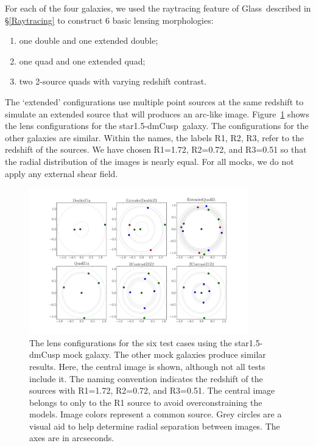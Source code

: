 \documentclass[galley,usenatbib]{mn2e}
\newcommand{\Glass}{{\sc Glass}}
\newcommand{\figref}[1] {Figure~\ref{#1}}
\newcommand{\secref}[1] {\S\ref{#1}}
\newcommand{\mockBC}{{\sc star1.5-dmCusp}}
\begin{document}
For each of the four galaxies, we used the raytracing feature of \Glass\
described in \secref{Raytracing} to construct 6 basic lensing morphologies:

\begin{enumerate}
\item one double and one extended double;
\item one quad and one extended quad;
\item two 2-source quads with varying redshift contrast.
\end{enumerate}
The `extended' configurations use multiple point sources at the same redshift
to simulate an extended source that will produces an arc-like image.
\figref{arrival surfaces} shows the lens configurations for the \mockBC\
galaxy.  The configurations for the other galaxies are similar. Within the
names, the labels R1, R2, R3, refer to the redshift of the sources. We have
chosen R1=1.72, R2=0.72, and R3=0.51 so that the radial distribution of the
images is nearly equal. For all mocks, we do not apply any external shear field.

\begin{figure}
\includegraphics[width=0.85\textwidth]{BCarrival_surfaces}
\caption{The lens configurations for the six test cases using the \mockBC{}
mock galaxy. The other mock galaxies produce similar results. Here, the central
image is shown, although not all tests include it. The naming convention
indicates the redshift of the sources with R1=1.72, R2=0.72, and R3=0.51.  The
central image belongs to only to the R1 source to avoid overconstraining the
models. Image colors represent a common source. Grey circles are a visual aid
to help determine radial separation between images. The axes are in
arcseconds.}
\label{arrival surfaces}
\end{figure}
\end{document}
